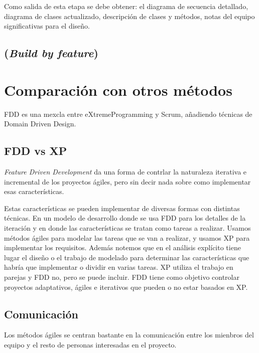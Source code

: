 \documentclass[11pt]{article}
\begin{document}
Como salida de esta etapa se debe obtener: el diagrama de secuencia detallado, diagrama de clases actualizado, descripción de clases y métodos, notas del equipo significativas para el diseño.

\subsection{(\textit{Build by feature})}



\section{Comparación con otros métodos}
FDD es una mexcla entre eXtremeProgramming y Scrum, añadiendo técnicas de Domain Driven Design. %

\subsection*{FDD vs XP}
\textit{Feature Driven Development} da una forma de contrlar la naturaleza iterativa e incremental de los proyectos ágiles, pero sin decir nada sobre como implementar esas características.

Estas características se pueden implementar de diversas formas con distintas técnicas.
En un modelo de desarrollo donde se usa FDD para los detalles de la iteración y en donde las características se tratan como tareas a realizar.
Usamos métodos ágiles para modelar las tareas que se van a realizar, y usamos XP para implementar los requisitos. Además notemos que en el análisis explícito tiene lugar el diseño o el trabajo de modelado para determinar las características que habría que implementar o dividir en varias tareas. 
XP utiliza el trabajo en parejas y FDD no, pero se puede incluir. 
FDD tiene como objetivo controlar
proyectos adaptativos, ágiles e iterativos que pueden o no estar basados en XP.

\subsection*{Comunicación}
Los métodos ágiles se centran bastante en la comunicación entre los mienbros del equipo y el resto de personas interesadas en el proyecto.
\end{document}
